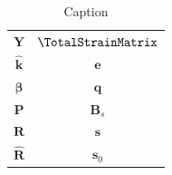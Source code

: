 \begin{table}[H]
    \centering
    \begin{tabular}{c|c}
        \(\mathbf{Y}\) & \(\TotalStrainMatrix\) \\
        \(\hat{\mathbf{k}}\) & \(\hat{\bm{e}}\) \\
        \(\bm{\beta}\) & \(\bm{q}\) \\
        \(\mathbf{P}\) & \(\mathbf{B}_s\) \\
        \({\mathbf{R}}\) & \(\bm{s}\) \\
        \(\widehat{\mathbf{R}}\) & \(\bm{s}_0\)
    \end{tabular}
    \caption{Caption}
    \label{tab:placeholder}
\end{table}